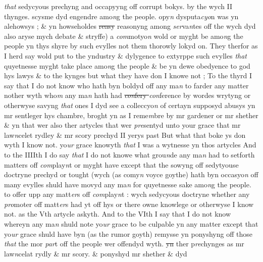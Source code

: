 \documentclass[12pt, a4paper]{book}
\begin{document}
               \textit{that}  sedycyous prechyng and occapyyng off corrupt bokys. by the wych II  thynges. scysme dyd engendre amo\textit{n}g the people. opy\textit{n} dysputa\textit{cyo}n was yn  alehowsys ; \& yn howseholdes \sout{reasy }reasonyng among \textit{ser}va\textit{n}tes off the wych dyd also aryse mych debate \& stryffe) a \textit{com}motyo\textit{n} wold or myght be amo\textit{n}g the people yn thys shyre by such evylles not them thorowly lokyd on. They therfor as I herd say wold put to the yndustry \& dylygence to extyrppe such evylles \textit{that} quyetnesse myght take place amo\textit{n}g the people \& be yn dewe obedyence  to god hys lawys \& to the kynges but what they have don I knowe not ;  
				\marginpar[\vspace{0.5cm}{\textcolor{Gray}{3}}]{}
			 To the thyrd I say that I do not know who hath byn boldyd off any ma\textit{n} to  farder any matter nother wyth who\textit{m} any ma\textit{n} hath had \textit{}
               \sout{
                  \textit{con}fery \textit{}
               }
               \textit{con}ference by wordes wrytyng or otherwyse savyng \textit{that} ones I dyd see a colleccyo\textit{n} of certayn supposyd abusys yn mr sentleger hys chambre, broght yn as I reme\textit{m}bre by mr gardener or mr shether \& yn that wer also ther artycles that wer \textit{pre}sentyd unto your grace  that mr law\textit{n}celet rydley \& mr scory prechyd II yerys past But what that boke ys don wyth I know not. yo\textit{ur} grace knowyth \textit{that} I was a wytnesse yn thos artycles  
				\marginpar[\vspace{0.5cm}{\textcolor{Gray}{4}}]{}
			 And to the IIIIth I do say \textit{that} I do not knowe what grou\textit{n}de any ma\textit{n} had to setforth matters off \textit{com}play\textit{n}t or myght have 
			except that the sowyng off sedytyouse doctryne prechyd or tought (wych (as comy\textit{n} voyce goythe) hath byn occasyo\textit{n} off many evylles shuld have movyd any ma\textit{n} for quyetnesse sake amo\textit{n}g the people. to offer upp any matt\textit{er}s off \textit{com}play\textit{n}t : wych sedycyous doctryne whether any \textit{pro}moter off matt\textit{er}s had yt off hys or
			 there owne knowlege or otherwyse I know not. as the  Vth artycle askyth.   
				\marginpar[\vspace{0.5cm}{\textcolor{Gray}{6}}]{}
			 And to the VIth I say that I do not know whereyn any ma\textit{n} shuld note yo\textit{ur} grace to be culpable yn any matter except that yo\textit{ur} grace shuld have byn (as the rumor goyth) remysse yn ponyshyng off those \textit{that} the mor \textit{par}t off the people wer offendyd wyth. \sout{yn }ther p\textit{re}chynges as mr law\textit{n}celat rydly \& mr scory. \& ponyshyd mr shether \& dyd
\end{document}
